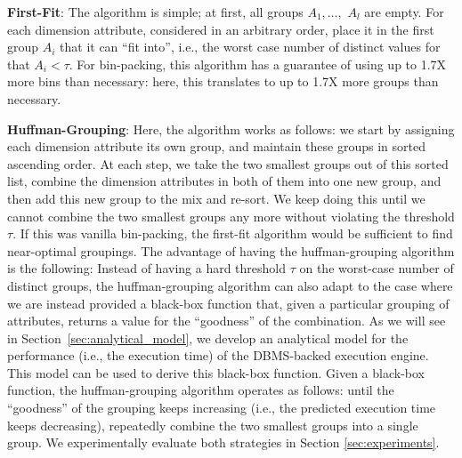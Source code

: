 \squishlist 
  \item {\bf First-Fit}: The algorithm is simple;
  at first, all groups $A_1, \ldots, $ $A_l$ are empty.
  For each dimension attribute, considered in an arbitrary order, place it in the first group
  $A_i$ that it can ``fit into'', i.e., the worst case
  number of distinct values for that $A_i < \tau$.
  For bin-packing, this algorithm has a guarantee of using up to 1.7X more 
  bins than necessary: here, this translates to up to 1.7X more groups than necessary.
  \item {\bf Huffman-Grouping}: Here, the algorithm works as follows:
  we start by assigning each dimension attribute its own group,
  and maintain these groups in sorted ascending order.
  At each step, we take the two smallest groups out of this sorted list, combine
  the dimension attributes in both of them into one new group, and then
  add this new group to the mix and re-sort.
  We keep doing this until we cannot combine the two smallest groups any more
  without violating the threshold $\tau$.
\squishend
If this was vanilla bin-packing, the first-fit algorithm would be sufficient to
find near-optimal groupings. 
The advantage of having the huffman-grouping algorithm is the following: Instead
of having a hard threshold $\tau$ on the worst-case number of distinct groups,
the huffman-grouping algorithm can also adapt to the case where we
are instead provided a black-box function that, given a particular
grouping of attributes, returns a value for the ``goodness'' of the combination.
As we will see in Section~\ref{sec:analytical_model}, 
we develop an analytical model for the performance (i.e., the execution time)
of the DBMS-backed execution engine. 
This model can be used to derive this black-box function.
Given a black-box function, the huffman-grouping algorithm operates
as follows: until the ``goodness'' of the grouping keeps increasing 
(i.e., the predicted execution time keeps decreasing),
repeatedly combine the two smallest groups into a single group.
We experimentally evaluate both strategies in Section \ref{sec:experiments}.

